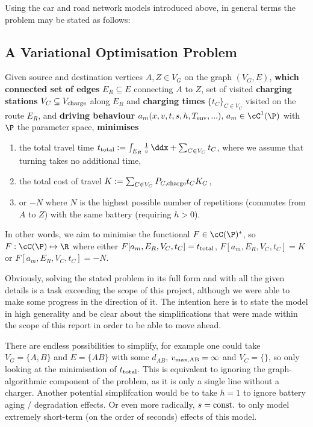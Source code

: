 \documentclass{prettytex/ox/mmsc-special-topic}
\begin{document}
  Using the car and road network models introduced above, in general terms the problem may be stated as follows:

  \subsection{A Variational Optimisation Problem}
  \label{sec:problem}
  Given source and destination vertices $A, Z \in V_G$ on the graph $(V_G, E)$, \textbf{which connected set of edges} $E_R \subseteq E$ connecting $A$ to $Z$, set of visited \textbf{charging stations} $V_C \subseteq V_{\rm charge}$ along $E_R$ and \textbf{charging times} $\{t_C\}_{C \in V_C}$ visited on the route $E_R$, and \textbf{driving behaviour} $a_m(x, v, t, s, h, T_{\rm env}, ...),\, a_m \in \cC^1(\P)$ with $\P$ the parameter space, \textbf{minimises}
  \begin{enumerate}
    \item the total travel time $t_{\rm total} := \int_{E_R} \frac{1}{v} \,\ddx + \sum_{C \in V_C} t_C$, where we assume that turning takes no additional time,
    \item the total cost of travel $K := \sum_{C \in V_C} P_{C, \rm charge} t_{C} K_C$,
    \item or $-N$ where $N$ is the highest possible number of repetitions (commutes from $A$ to $Z$) with the same battery (requiring $h > 0$). \label{minoption:aging}
  \end{enumerate}
  In other words, we aim to minimise the functional $F \in \cC(\P)^*$, so $F: \cC(\P) \mapsto \R$ where either $F[a_m, E_R, V_C, t_C] = t_{\rm total}$, $F[a_m, E_R, V_C, t_C] = K$ or $F[a_m, E_R, V_C, t_C] = -N$.

  Obviously, solving the stated problem in its full form and with all the given details is a task exceeding the scope of this project, although we were able to make some progress in the direction of it.
  The intention here is to state the model in high generality and be clear about the simplifications that were made within the scope of this report in order to be able to move ahead.

  There are endless possibilities to simplify, for example one could take
  $V_G = \{A, B\}$ and $E = \{AB\}$ with some $d_{AB}$, $v_{\rm max, AB} = \infty$ and $V_C = \{\}$, so only looking at the minimisation of $t_{\rm total}$. This is equivalent to ignoring the graph-algorithmic component of the problem, as it is only a single line without a charger.
  Another potential simplifcation would be to take $h = 1$ to ignore battery aging / degradation effects. Or even more radically, $s = \rm const.$ to only model extremely short-term (on the order of seconds) effects of this model.
\end{document}
